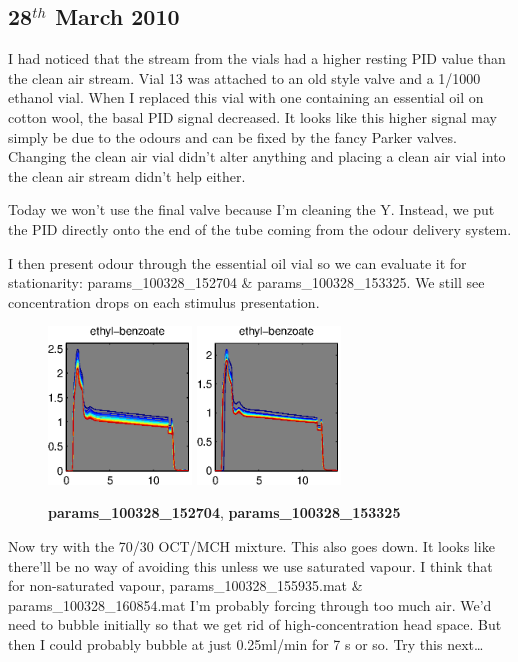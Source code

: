\documentclass[a4paper]{report}
\begin{document}
\clearpage
\subsection{28$^{th}$ March 2010}
I had noticed that the stream from the vials had a higher resting PID
value than the clean air stream. Vial 13 was attached to an old style
valve and a 1/1000 ethanol vial. When I replaced this vial with one
containing an essential oil on cotton wool, the basal PID signal
decreased. It looks like this higher signal may simply be due to the
odours and can be fixed by the fancy Parker valves. Changing the clean
air vial didn't alter anything and placing a clean air vial into the
clean air stream didn't help either. 

Today we won't use the final valve because I'm cleaning the
Y. Instead, we put the PID directly onto the end of the tube coming
from the odour delivery system. 

I then present odour through the essential oil vial so we can evaluate
it for stationarity: params\_100328\_152704 \& params\_100328\_153325.
We still see concentration drops on each stimulus presentation.   

\begin{figure}[h]
\centering
\includegraphics[width=1.5in]{params_100328_152704.eps}
\includegraphics[width=1.5in]{params_100328_153325.eps}
\caption{\textbf{params\_100328\_152704}, \textbf{params\_100328\_153325}}
\end{figure}

\clearpage

Now try with the 70/30 OCT/MCH mixture. 
This also goes down. It looks like there'll be no way of avoiding this
unless we use saturated vapour. I think that for non-saturated vapour,
params\_100328\_155935.mat \& params\_100328\_160854.mat
I'm probably forcing through too much air. We'd need to bubble
initially so that we get rid of high-concentration head space. But
then I could probably bubble at just 0.25ml/min for 7 s or so. Try
this next\ldots
\end{document}
